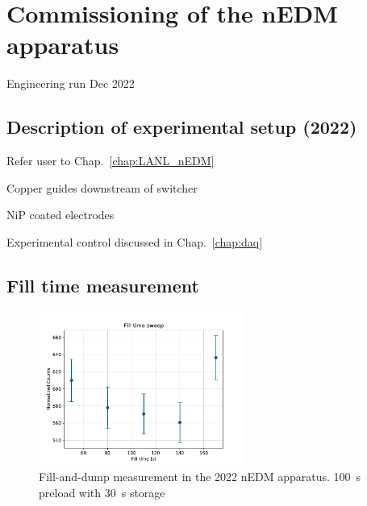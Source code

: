 
\chapter{Commissioning of the nEDM apparatus}\label{chap:nEDM_commissioning_dec2022}


Engineering run Dec 2022


\section{Description of experimental setup (2022)}


Refer user to Chap.~\ref{chap:LANL_nEDM}

Copper guides downstream of switcher

NiP coated electrodes

Experimental control discussed in Chap.~\ref{chap:daq}


\section{Fill time measurement}


 \begin{figure}
    \centering
    \includegraphics[width=0.6\textwidth]{figures/2022_fill_sweep.pdf}
    \caption
     {Fill-and-dump measurement in the 2022 nEDM apparatus. \qty{100}{s} preload with \qty{30}{s} storage}
    \label{fig:2022_fill_time_sweep}
\end{figure}

